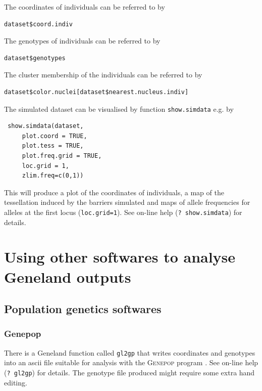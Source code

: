 \documentclass[a4paper,10pt]{article}
\begin{document}
The coordinates of individuals can be referred to by 

\begin{verbatim}
dataset$coord.indiv
\end{verbatim}



The genotypes of individuals can be referred to by 

\begin{verbatim}
dataset$genotypes
\end{verbatim}



The cluster membership of the individuals can be referred to by 

\begin{verbatim}
dataset$color.nuclei[dataset$nearest.nucleus.indiv]
\end{verbatim}





The simulated dataset can be visualised by function {\tt show.simdata} e.g. by

\begin{verbatim}
 show.simdata(dataset,
     plot.coord = TRUE,
     plot.tess = TRUE,
     plot.freq.grid = TRUE,
     loc.grid = 1,
     zlim.freq=c(0,1))
\end{verbatim}



 This will produce a plot of the coordinates of individuals, a map of the tessellation induced by the barriers simulated and 
maps of allele frequencies for alleles at the first locus ({\tt loc.grid=1}). 
See on-line help ({\tt ? show.simdata}) for details.

\clearpage
\section{Using other softwares to analyse {\sc Geneland} outputs}

\subsection{Population genetics softwares}

\subsubsection{Genepop}
There is a {\sc Geneland} function called \texttt{gl2gp} that writes coordinates and genotypes into an ascii file suitable for analysis 
with the \textsc{Genepop} program \citep{Rousset07}. See on-line help (\texttt{? gl2gp}) for details. 
The genotype file produced might require some extra hand editing.
\end{document}
